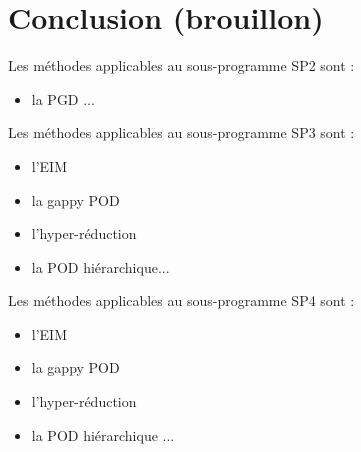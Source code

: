 \documentclass[a4paper,12pt,titlepage]{article}
\begin{document}
\section{Conclusion (brouillon)}

Les méthodes applicables au sous-programme SP2 sont :
\begin{itemize}
\item la PGD ...
\end{itemize}

Les méthodes applicables au sous-programme SP3 sont :
\begin{itemize}
\item l'EIM
\item la gappy POD
\item l'hyper-réduction
\item la POD hiérarchique...
\end{itemize}

Les méthodes applicables au sous-programme SP4 sont :
\begin{itemize}
\item l'EIM
\item la gappy POD
\item l'hyper-réduction
\item la POD hiérarchique ...
\end{itemize}



\end{document}
